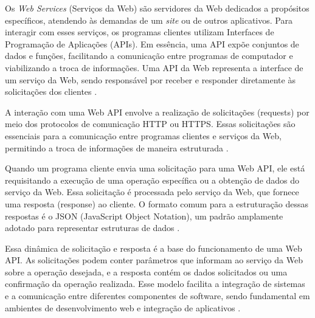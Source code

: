 Os \textit{Web Services} (Serviços da Web) são servidores da Web dedicados a propósitos específicos, atendendo às demandas de um \textit{site} ou de outros aplicativos. Para interagir com esses serviços, os programas clientes utilizam Interfaces de Programação de Aplicações (APIs). Em essência, uma API expõe conjuntos de dados e funções, facilitando a comunicação entre programas de computador e viabilizando a troca de informações. Uma API da Web representa a interface de um serviço da Web, sendo responsável por receber e responder diretamente às solicitações dos clientes \cite[p.~5]{masse}.

A interação com uma Web API envolve a realização de solicitações (requests) por meio dos protocolos de comunicação HTTP ou HTTPS. Essas solicitações são essenciais para a comunicação entre programas clientes e serviços da Web, permitindo a troca de informações de maneira estruturada \cite[p.~18-20]{richardson}. 

Quando um programa cliente envia uma solicitação para uma Web API, ele está requisitando a execução de uma operação específica ou a obtenção de dados do serviço da Web. Essa solicitação é processada pelo serviço da Web, que fornece uma resposta (response) ao cliente. O formato comum para a estruturação dessas respostas é o JSON (JavaScript Object Notation), um padrão amplamente adotado para representar estruturas de dados \cite[p.~19-21]{richardson}. 

Essa dinâmica de solicitação e resposta é a base do funcionamento de uma Web API. As solicitações podem conter parâmetros que informam ao serviço da Web sobre a operação desejada, e a resposta contém os dados solicitados ou uma confirmação da operação realizada. Esse modelo facilita a integração de sistemas e a comunicação entre diferentes componentes de software, sendo fundamental em ambientes de desenvolvimento web e integração de aplicativos \cite[p.~20-23]{richardson}.
